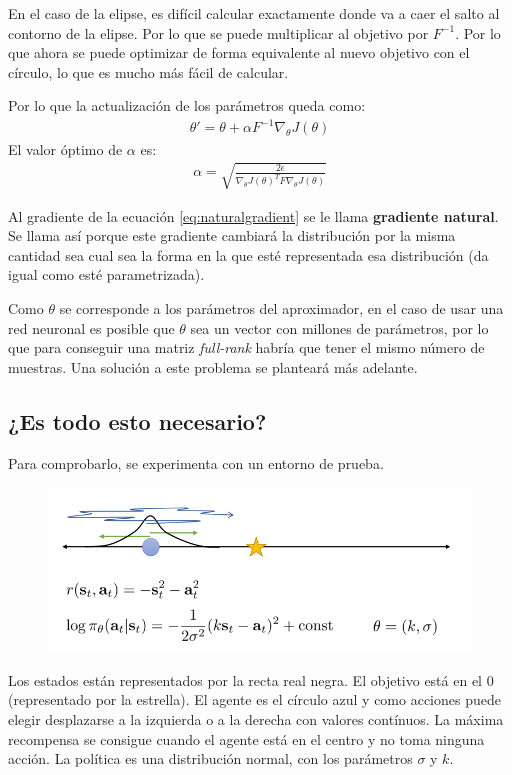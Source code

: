 En el caso de la elipse, es difícil calcular exactamente donde va a caer el salto al contorno de
la elipse. Por lo que se puede multiplicar al objetivo por $F^{-1}$. Por lo que ahora se puede
optimizar de forma equivalente al nuevo objetivo con el círculo, lo que es mucho más fácil de
calcular.

Por lo que la actualización de los parámetros queda como:
\begin{align}
    \label{eq:naturalgradient}
    \theta'=\theta+\alpha F^{-1}\nabla_\theta J(\theta)
\end{align}
El valor óptimo de $\alpha$ es:
\begin{align}
    \label{eq:trpoalfa}
\alpha = \sqrt { \frac { 2 \epsilon } { \nabla _ { \theta } J ( \theta ) ^ { T } F \nabla _ { \theta } J ( \theta ) } }
\end{align}

Al gradiente de la ecuación \ref{eq:naturalgradient} se le llama \textbf{gradiente
natural}. Se llama así porque este gradiente cambiará la distribución por la misma cantidad sea
cual sea la forma en la que esté representada esa distribución (da igual como esté
parametrizada). 

Como $\theta$ se corresponde a los parámetros del aproximador, en el caso de usar una red
neuronal es posible que $\theta$ sea un vector con millones de parámetros, por lo que para
conseguir una matriz \textit{full-rank} habría que tener el mismo número de muestras. Una
solución a este problema se planteará más adelante.

\subsection{¿Es todo esto necesario?}%
\label{sub:_es_todo_esto_necesario_}

Para comprobarlo, se experimenta con un entorno de prueba.
\begin{figure}[H]
	\centering
	\includegraphics[width=0.8\linewidth]{figures/2020-06-17-165745_776x302_scrot.png}
\end{figure}
Los estados están representados por la recta real negra. El objetivo está en el 0 (representado
por la estrella). El agente es el círculo azul y como acciones puede elegir desplazarse a la
izquierda o a la derecha con valores contínuos. La máxima recompensa se consigue cuando el agente
está en el centro y no toma ninguna acción. La política es una distribución normal, con los
parámetros $\sigma$ y $k$.

